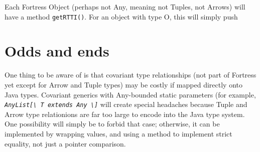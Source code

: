 \documentclass[11pt]{article}
\newcommand{\ftt}[1]{{\tt\slshape{#1}}}
\def\BS{\textbackslash}
\begin{document}
Each Fortress Object (perhaps not Any, meaning not Tuples, not Arrows) will have a method \verb+getRTTI()+.  For an object with type O, this will simply push 


\section{Odds and ends}

One thing to be aware of is that covariant type relationships (not part of Fortress yet except for Arrow and Tuple types) may be costly if mapped directly onto Java types.  Covariant generics with Any-bounded static parameters (for example,  \ftt{AnyList[\BS\ T extends Any \BS]} will create special headaches because Tuple and Arrow type relationions are far too large to encode into the Java type system.  One possibility will simply be to forbid that case; otherwise, it can be implemented by wrapping values, and using a method to implement strict equality, not just a pointer comparison. 
\end{document}
